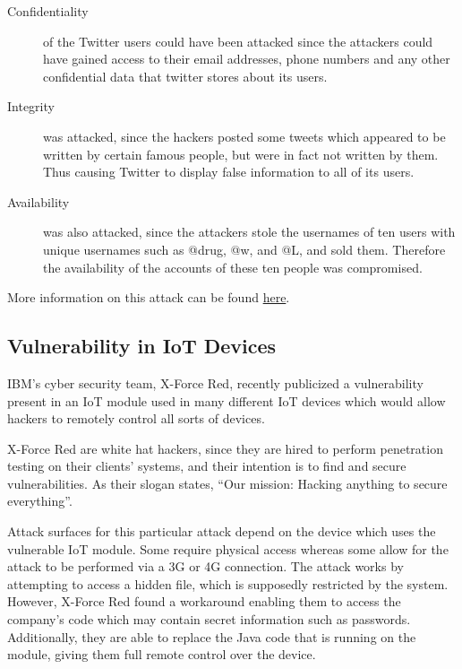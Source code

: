 \documentclass{article}
\begin{document}
\begin{description}
	\item[Confidentiality] of the Twitter users could have been attacked since the attackers could have gained access to their email addresses, phone numbers and any other confidential data that twitter stores about its users.

	\item[Integrity] was attacked, since the hackers posted some tweets which appeared to be written by certain famous people, but were in fact not written by them. Thus causing Twitter to display false information to all of its users.

	\item[Availability] was also attacked, since the attackers stole the usernames of ten users with unique usernames such as @drug, @w, and @L, and sold them. Therefore the availability of the accounts of these ten people was compromised.
\end{description}

More information on this attack can be found \href{https://nytimes.com/2020/07/31/technology/twitter-hack-arrest.html}{here}.


\subsection{Vulnerability in IoT Devices}

IBM's cyber security team, X-Force Red, recently publicized a vulnerability present in an IoT module used in many different IoT devices which would allow hackers to remotely control all sorts of devices.

X-Force Red are white hat hackers, since they are hired to perform penetration testing on their clients' systems, and their intention is to find and secure vulnerabilities. As their slogan states, ``Our mission: Hacking anything to secure everything''.

Attack surfaces for this particular attack depend on the device which uses the vulnerable IoT module. Some require physical access whereas some allow for the attack to be performed via a 3G or 4G connection. The attack works by attempting to access a hidden file, which is supposedly restricted by the system. However, X-Force Red found a workaround enabling them to access the company's code which may contain secret information such as passwords. Additionally, they are able to replace the Java code that is running on the module, giving them full remote control over the device.
\end{document}
